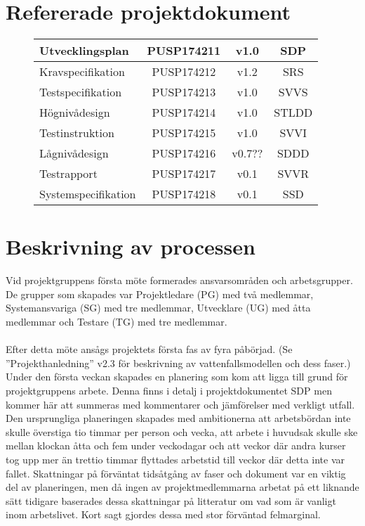 \documentclass[paper=a4, fontsize=11pt,twoside]{article}
\begin{document}
\section{Refererade projektdokument}
\begin{figure}[h!]
\centering
\begin{tabular}{|l|c|c|c|}
\hline
Utvecklingsplan & PUSP174211 & v1.0 & SDP\\
\hline
Kravspecifikation & PUSP174212 & v1.2 & SRS\\
\hline
Testspecifikation & PUSP174213 & v1.0 & SVVS\\
\hline 
Högnivådesign & PUSP174214 & v1.0 & STLDD\\ 
\hline
Testinstruktion & PUSP174215 & v1.0 & SVVI\\
\hline
Lågnivådesign & PUSP174216 & v0.7?? & SDDD\\
\hline
Testrapport & PUSP174217 & v0.1 & SVVR\\
\hline
Systemspecifikation & PUSP174218 & v0.1 & SSD\\
\hline
\end{tabular}
\end{figure}

\section{Beskrivning av processen}
Vid projektgruppens första möte formerades ansvarsområden och arbetsgrupper. 
De grupper som skapades var Projektledare (PG) med två medlemmar, Systemansvariga (SG) 
med tre medlemmar, Utvecklare (UG) med åtta medlemmar och Testare (TG) med tre
medlemmar.\\
\\
Efter detta möte ansågs projektets första fas av fyra påbörjad. 
(Se ”Projekthanledning” v2.3 för beskrivning av vattenfallsmodellen och dess faser.)
Under den första veckan skapades en planering som kom att ligga till grund för 
projektgruppens arbete. Denna finns i detalj i projektdokumentet SDP men kommer här att 
summeras med kommentarer och jämförelser med verkligt utfall.
Den ursprungliga planeringen skapades med ambitionerna att arbetsbördan inte skulle 
överstiga tio timmar per person och vecka, att arbete i huvudsak skulle ske mellan klockan 
åtta och fem under veckodagar och att veckor där andra kurser tog upp mer än trettio 
timmar flyttades arbetstid till veckor där detta inte var fallet.
Skattningar på förväntat tidsåtgång av faser och dokument var en viktig del av 
planeringen, men då ingen av projektmedlemmarna arbetat på ett liknande sätt tidigare 
baserades dessa skattningar på litteratur om vad som är vanligt inom arbetslivet. Kort 
sagt gjordes dessa med stor förväntad felmarginal.
\end{document}
